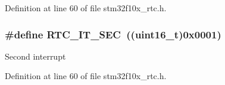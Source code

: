 Definition at line 60 of file stm32f10x\+\_\+rtc.\+h.

\subsubsection[{\texorpdfstring{R\+T\+C\+\_\+\+I\+T\+\_\+\+S\+EC}{RTC_IT_SEC}}]{\setlength{\rightskip}{0pt plus 5cm}\#define R\+T\+C\+\_\+\+I\+T\+\_\+\+S\+EC~(({\bf uint16\+\_\+t})0x0001)}\hypertarget{group___r_t_c__interrupts__define_ga960bccbc10da872549cf52c03dd342f1}{}\label{group___r_t_c__interrupts__define_ga960bccbc10da872549cf52c03dd342f1}
Second interrupt 

Definition at line 60 of file stm32f10x\+\_\+rtc.\+h.

